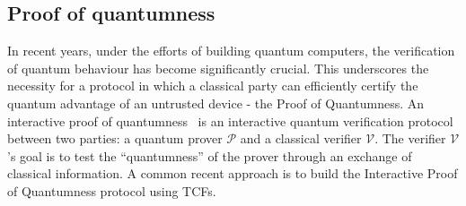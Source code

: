 \documentclass[cryptography,review,submit,pdftex,moreauthors,amsmath,amssymb,aps,strict]{Definitions/mdpi}
\begin{document}
\subsection{Proof of quantumness}
In recent years, under the efforts of building quantum computers, the verification of quantum behaviour has become significantly crucial. This underscores the necessity for a protocol in which a classical party can efficiently certify the quantum advantage of an untrusted device - the Proof of Quantumness. An interactive proof of quantumness~\cite{Brakerski18_Interactiveproofofquantumness,experiment_interactive_PoQ} is an interactive quantum verification protocol between two parties: a quantum prover $\mathcal{P}$ and a classical verifier $\mathcal{V}$. The verifier $\mathcal{V}$'s goal is to test the ``quantumness'' of the prover through an exchange of classical information. A common recent approach is to build the Interactive Proof of Quantumness protocol using TCFs.

\end{document}

